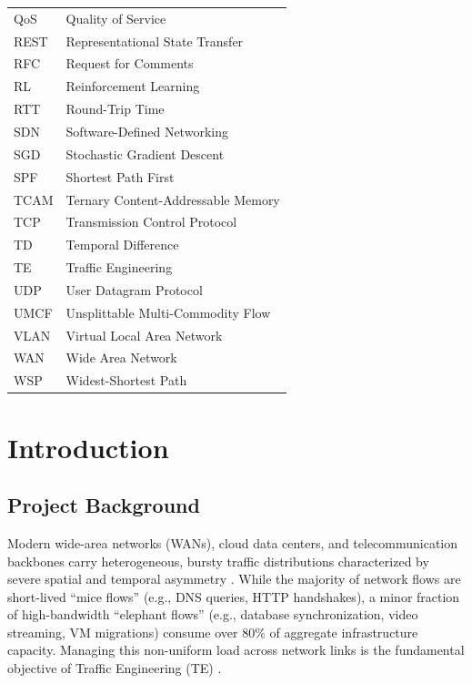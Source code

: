 \documentclass[12pt,a4paper,oneside]{report}
\begin{document}
\begin{longtable}{p{32mm}p{115mm}}
QoS & Quality of Service\\
REST & Representational State Transfer\\
RFC & Request for Comments\\
RL & Reinforcement Learning\\
RTT & Round-Trip Time\\
SDN & Software-Defined Networking\\
SGD & Stochastic Gradient Descent\\
SPF & Shortest Path First\\
TCAM & Ternary Content-Addressable Memory\\
TCP & Transmission Control Protocol\\
TD & Temporal Difference\\
TE & Traffic Engineering\\
UDP & User Datagram Protocol\\
UMCF & Unsplittable Multi-Commodity Flow\\
VLAN & Virtual Local Area Network\\
WAN & Wide Area Network\\
WSP & Widest-Shortest Path\\
\bottomrule
\end{longtable}

\clearpage
{}
\setcounter{page}{1}

\chapter{Introduction}
\label{chap:introduction}

\section{Project Background}
Modern wide-area networks (WANs), cloud data centers, and telecommunication backbones carry heterogeneous, bursty traffic distributions characterized by severe spatial and temporal asymmetry \cite{mckeown2008openflow}. While the majority of network flows are short-lived ``mice flows'' (e.g., DNS queries, HTTP handshakes), a minor fraction of high-bandwidth ``elephant flows'' (e.g., database synchronization, video streaming, VM migrations) consume over 80\% of aggregate infrastructure capacity. Managing this non-uniform load across network links is the fundamental objective of Traffic Engineering (TE) \cite{wang2008internet}.
\end{document}

